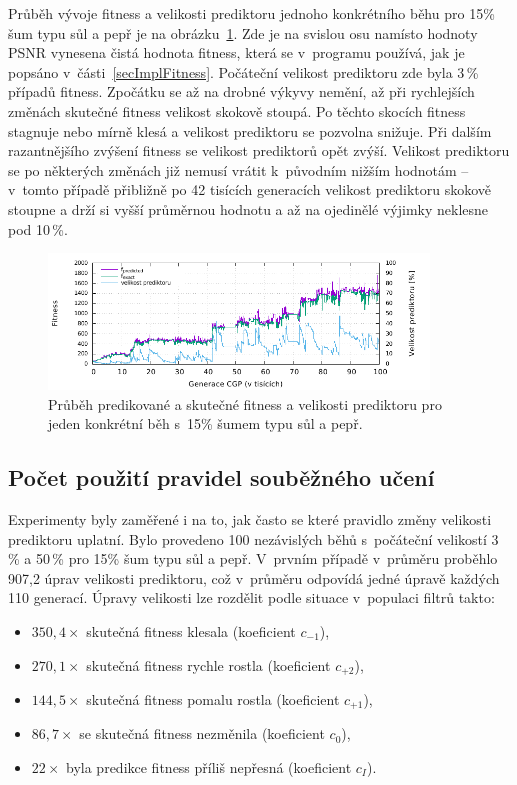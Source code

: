 Průběh vývoje fitness a velikosti prediktoru jednoho konkrétního běhu pro 15\% šum typu sůl a pepř je na obrázku~\ref{plotFitPred}. Zde je na svislou osu namísto hodnoty PSNR vynesena čistá hodnota fitness, která se v~programu používá, jak je popsáno v~části~\ref{secImplFitness}. Počáteční velikost prediktoru zde byla 3\,\% případů fitness. Zpočátku se až na drobné výkyvy nemění, až při rychlejších změnách skutečné fitness velikost skokově stoupá. Po těchto skocích fitness stagnuje nebo mírně klesá a velikost prediktoru se pozvolna snižuje. Při dalším razantnějšího zvýšení fitness se velikost prediktorů opět zvýší. Velikost prediktoru se po některých změnách již nemusí vrátit k~původním nižším hodnotám -- v~tomto případě přibližně po 42 tisících generacích velikost prediktoru skokově stoupne a drží si vyšší průměrnou hodnotu a až na ojedinělé výjimky neklesne pod 10\,\%.

\begin{figure}[htb]
    \centering
    \includegraphics[width=0.9\textwidth]{fig/plot/run-fitpred1.pdf}
    \caption{Průběh predikované a skutečné fitness a velikosti prediktoru pro jeden konkrétní běh s~15\% šumem typu sůl a pepř.}
    \label{plotFitPred}
\end{figure}

\subsection{Počet použití pravidel souběžného učení}

Experimenty byly zaměřené i na to, jak často se které pravidlo změny velikosti prediktoru uplatní. Bylo provedeno 100 nezávislých běhů s~počáteční velikostí 3\,\% a 50\,\% pro 15\% šum typu sůl a pepř. V~prvním případě v~průměru proběhlo 907,2 úprav velikosti prediktoru, což v~průměru odpovídá jedné úpravě každých 110 generací. Úpravy velikosti lze rozdělit podle situace v~populaci filtrů takto:

\begin{itemize}
    \item $350,4\times$ skutečná fitness klesala (koeficient $c_{-1}$),
    \item $270,1\times$ skutečná fitness rychle rostla (koeficient $c_{+2}$),
    \item $144,5\times$ skutečná fitness pomalu rostla (koeficient $c_{+1}$),
    \item $86,7\times$ se skutečná fitness nezměnila (koeficient $c_{0}$),
    \item $22\times$ byla predikce fitness příliš nepřesná (koeficient $c_{I}$).
\end{itemize}

